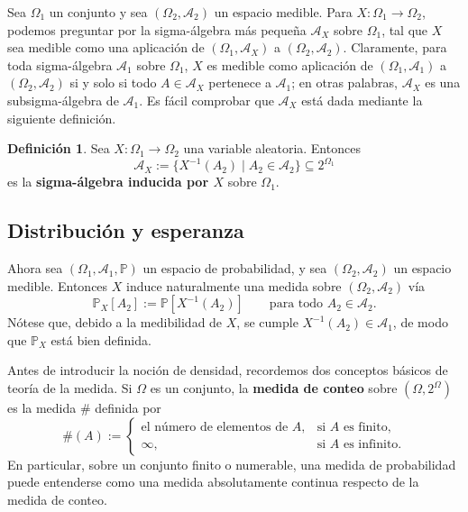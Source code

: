 \documentclass[11pt]{report}
\newenvironment{tcolorbox}[1][]{\par\medskip\noindent\ignorespaces}{\par\medskip}
\theoremstyle{definition}
\newtheorem{definicion}{Definición}[section]
\theoremstyle{plain}
\numberwithin{equation}{section}
\begin{document}
Sea \(\Omega_1\) un conjunto y sea \((\Omega_2,\mathcal{A}_2)\) un espacio medible. Para \(X:\Omega_1\to\Omega_2\), podemos preguntar por la sigma-álgebra más pequeña \(\mathcal{A}_X\) sobre \(\Omega_1\), tal que \(X\) sea medible como una aplicación de \((\Omega_1,\mathcal{A}_X)\) a \((\Omega_2,\mathcal{A}_2)\). Claramente, para toda sigma-álgebra \(\mathcal{A}_1\) sobre \(\Omega_1\), \(X\) es medible como aplicación de \((\Omega_1,\mathcal{A}_1)\) a \((\Omega_2,\mathcal{A}_2)\) si y solo si todo \(A\in\mathcal{A}_X\) pertenece a \(\mathcal{A}_1\); en otras palabras, \(\mathcal{A}_X\) es una subsigma-álgebra de \(\mathcal{A}_1\). Es fácil comprobar que \(\mathcal{A}_X\) está dada mediante la siguiente definición.

\begin{tcolorbox}[colback=blue!8, colframe=blue!8, boxrule=0pt]
\begin{definicion}
Sea \(X:\Omega_1\to\Omega_2\) una variable aleatoria. Entonces
\begin{equation*}
    \mathcal{A}_X:=\{X^{-1}(A_2)\mid A_2\in\mathcal{A}_2\}\subseteq 2^{\Omega_1}
\end{equation*}
es la \textbf{sigma-álgebra inducida por \(X\)} sobre \(\Omega_1\).
\end{definicion}
\end{tcolorbox}

\subsection{Distribución y esperanza}

Ahora sea \((\Omega_1,\mathcal{A}_1,\mathbb{P})\) un espacio de probabilidad, y sea \((\Omega_2,\mathcal{A}_2)\) un espacio medible. Entonces \(X\) induce naturalmente una medida sobre \((\Omega_2,\mathcal{A}_2)\) vía
\begin{equation*}
    \mathbb{P}_X[A_2]:=\mathbb{P}[X^{-1}(A_2)]
    \qquad
    \text{para todo } A_2\in\mathcal{A}_2.
\end{equation*}
Nótese que, debido a la medibilidad de \(X\), se cumple \(X^{-1}(A_2)\in\mathcal{A}_1\), de modo que \(\mathbb{P}_X\) está bien definida.

Antes de introducir la noción de densidad, recordemos dos conceptos básicos de teoría de la medida. Si \(\Omega\) es un conjunto, la \textbf{medida de conteo} sobre \((\Omega,2^\Omega)\) es la medida \(\#\) definida por
\begin{equation*}
    \#(A)
    :=
    \begin{cases}
        \text{el número de elementos de } A, & \text{si } A \text{ es finito},\\
        \infty, & \text{si } A \text{ es infinito}.
    \end{cases}
\end{equation*}
En particular, sobre un conjunto finito o numerable, una medida de probabilidad puede entenderse como una medida absolutamente continua respecto de la medida de conteo.
\end{document}
